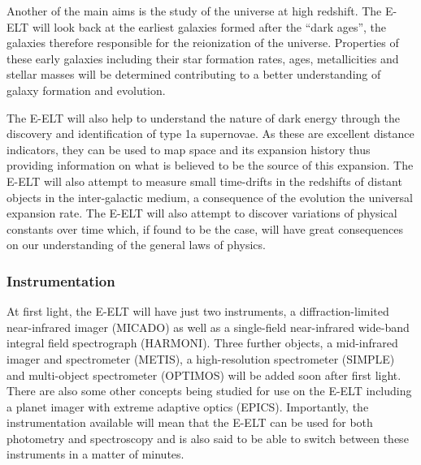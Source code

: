 		Another of the main aims is the study of the universe at high redshift. The E-ELT will look back at the earliest galaxies formed after the ``dark ages'', the galaxies therefore responsible for the reionization of the universe. Properties of these early galaxies including their star formation rates, ages, metallicities and stellar masses will be determined contributing to a better understanding of galaxy formation and evolution.

		The E-ELT will also help to understand the nature of dark energy through the discovery and identification of type 1a supernovae. As these are excellent distance indicators, they can be used to map space and its expansion history thus providing information on what is believed to be the source of this expansion. The E-ELT will also attempt to measure small time-drifts in the redshifts of distant objects in the inter-galactic medium, a consequence of the evolution the universal expansion rate. The E-ELT will also attempt to discover variations of physical constants over time which, if found to be the case, will have great consequences on our understanding of the general laws of physics.

	\subsubsection{Instrumentation} %
	\label{ssub:instrumentation}
		At first light, the E-ELT will have just two instruments\cite{E_ELT_Instrumentation}, a diffraction-limited near-infrared imager (MICADO) as well as a single-field near-infrared wide-band integral field spectrograph (HARMONI). Three further objects, a mid-infrared imager and spectrometer (METIS), a high-resolution spectrometer (SIMPLE) and multi-object spectrometer (OPTIMOS) will be added soon after first light\cite{E_ELT_Instrumentation}. There are also some other concepts being studied for use on the E-ELT including a planet imager with extreme adaptive optics (EPICS). Importantly, the instrumentation available will mean that the E-ELT can be used for both photometry and spectroscopy and is also said to be able to switch between these instruments in a matter of minutes.
